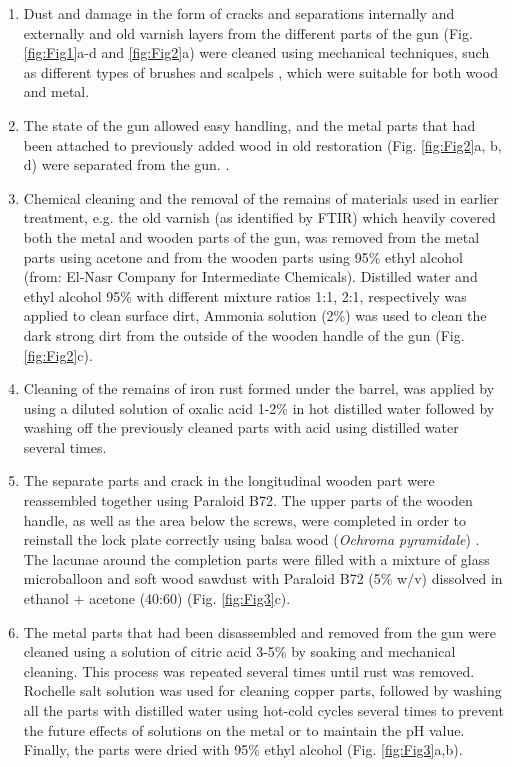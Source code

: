 \begin{enumerate}
	\item Dust and damage in the form of cracks and separations internally and externally and old varnish layers from the different parts of the gun (Fig. \ref{fig:Fig1}a-d and \ref{fig:Fig2}a) were cleaned using mechanical techniques, such as different types of brushes and scalpels \parencite[143]{Unger_2001}, which were suitable for both wood and metal.
	\item The state of the gun allowed easy handling, and the metal parts that had been attached to previously added wood in old restoration (Fig. \ref{fig:Fig2}a, b, d) were separated from the gun.  \parencites[1--2]{Davis_1998}[1--15]{Zelinka_2005}.
	\item Chemical cleaning and the removal of the remains of materials used in earlier treatment, e.g. the old varnish (as identified by FTIR) which heavily covered both the metal and wooden parts of the gun, was removed from the metal parts using acetone and from the wooden parts using 95\% ethyl alcohol (from: El-Nasr Company for Intermediate Chemicals). Distilled water and ethyl alcohol 95\% with different mixture ratios 1:1, 2:1, respectively was applied to clean surface dirt, Ammonia solution (2\%) was used to clean the dark strong dirt from the outside of the wooden handle of the gun (Fig. \ref{fig:Fig2}c). 
	\item Cleaning of the remains of iron rust formed under the barrel, was applied by using a diluted solution of oxalic acid 1-2\% in hot distilled water \parencites[5]{William_1999}[1--20]{Williams_2002} followed by washing off the previously cleaned parts with acid using distilled water several times.
	\item The separate parts and crack in the longitudinal wooden part were reassembled together using Paraloid B72. The upper parts of the wooden handle, as well as the area below the screws, were completed in order to reinstall the lock plate correctly using balsa wood (\textit{Ochroma pyramidale}) \parencite[4--11]{Newman_2013}. The lacunae around the completion parts were filled with a mixture of glass microballoon and soft wood sawdust with Paraloid B72 (5\% w/v) dissolved in ethanol + acetone (40:60) (Fig. \ref{fig:Fig3}c).
	\item The metal parts that had been disassembled and removed from the gun were cleaned using a solution of citric acid 3-5\% by soaking and mechanical cleaning. This process was repeated several times until rust was removed. Rochelle salt solution was used for cleaning copper parts, followed by washing all the parts with distilled water using hot-cold cycles several times to prevent the future effects of solutions on the metal or to maintain the pH value. Finally, the parts were dried with 95\% ethyl alcohol (Fig. \ref{fig:Fig3}a,b).

\end{enumerate}
